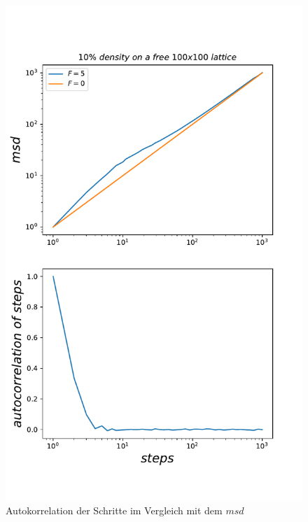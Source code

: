 \documentclass[a4paper, 12pt]{report}
\begin{document}
\begin{figure}[H]
	\centering
	\includegraphics[scale=0.7]{dens10_escp.pdf}
	\caption{Autokorrelation der Schritte im Vergleich mit dem $msd$}
\end{figure}

\clearpage
\end{document}
